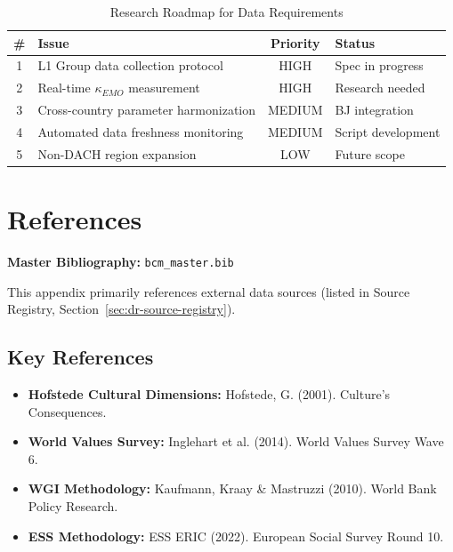 \begin{table}[htbp]
\centering
\caption{Research Roadmap for Data Requirements}
\label{tab:dr-roadmap}
\renewcommand{\arraystretch}{1.3}
\begin{tabular}{@{}clcl@{}}
\toprule
\textbf{\#} & \textbf{Issue} & \textbf{Priority} & \textbf{Status} \\
\midrule
1 & L1 Group data collection protocol & HIGH & Spec in progress \\
2 & Real-time $\kappa_{EMO}$ measurement & HIGH & Research needed \\
3 & Cross-country parameter harmonization & MEDIUM & BJ integration \\
4 & Automated data freshness monitoring & MEDIUM & Script development \\
5 & Non-DACH region expansion & LOW & Future scope \\
\bottomrule
\end{tabular}
\end{table}


\section{References}
\label{sec:dr-references}

\begin{tcolorbox}[colback=blue!5!white, colframe=blue!75!black]
\textbf{Master Bibliography:} \texttt{bcm\_master.bib}

This appendix primarily references external data sources (listed in Source Registry, Section~\ref{sec:dr-source-registry}).
\end{tcolorbox}

\subsection{Key References}

\begin{itemize}[nosep]
\item \textbf{Hofstede Cultural Dimensions:} Hofstede, G. (2001). Culture's Consequences.
\item \textbf{World Values Survey:} Inglehart et al. (2014). World Values Survey Wave 6.
\item \textbf{WGI Methodology:} Kaufmann, Kraay \& Mastruzzi (2010). World Bank Policy Research.
\item \textbf{ESS Methodology:} ESS ERIC (2022). European Social Survey Round 10.
\end{itemize}

